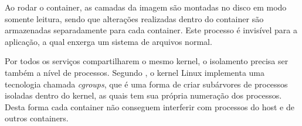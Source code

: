 Ao rodar o container, as camadas da imagem são montadas no disco em modo
somente leitura, sendo que alterações realizadas dentro do container são
armazenadas separadamente para cada container. Este processo é invisível para
a aplicação, a qual enxerga um sistema de arquivos normal.

Por todos os serviços compartilharem o mesmo kernel, o isolamento precisa
ser também a nível de processos. Segundo , o kernel
Linux implementa uma tecnologia chamada \emph{cgroups}, que é uma forma de
criar subárvores de processos isoladas dentro do kernel, as quais tem sua
própria numeração dos processos. Desta forma cada container não conseguem
interferir com processos do host e de outros containers.
